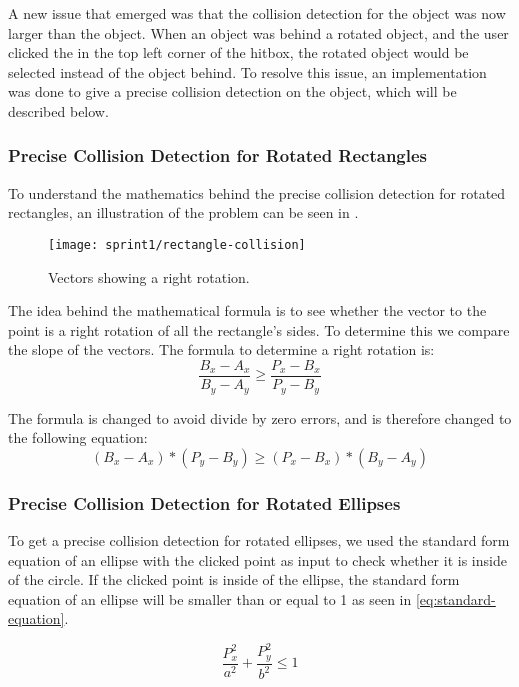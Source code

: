 A new issue that emerged was that the collision detection for the object was now larger than the object.
When an object was behind a rotated object, and the user clicked the in the top left corner of the hitbox, the rotated object would be selected instead of the object behind.
To resolve this issue, an implementation was done to give a precise collision detection on the object, which will be described below.

\subsubsection{Precise Collision Detection for Rotated Rectangles}
To understand the mathematics behind the precise collision detection for rotated rectangles, an illustration of the problem can be seen in .

\begin{figure}[h]
	\centering
	\texttt{[image: sprint1/rectangle-collision]}
	\caption{Vectors showing a right rotation.}
	\label{figure:rectangle-collision}
\end{figure}

The idea behind the mathematical formula is to see whether the vector to the point is a right rotation of all the rectangle's sides.
To determine this we compare the slope of the vectors.
The formula to determine a right rotation is:
\begin{equation}
	\frac{B_x-A_x}{B_y-A_y} \geq \frac{P_x-B_x}{P_y-B_y}
\end{equation}

The formula is changed to avoid divide by zero errors, and is therefore changed to the following equation:
\begin{equation}
	(B_x-A_x)*(P_y-B_y) \geq (P_x-B_x)*(B_y-A_y)
\end{equation} 

\subsubsection{Precise Collision Detection for Rotated Ellipses}
To get a precise collision detection for rotated ellipses, we used the standard form equation of an ellipse with the clicked point as input to check whether it is inside of the circle.
If the clicked point is inside of the ellipse, the standard form equation of an ellipse will be smaller than or equal to 1 as seen in \eqref{eq:standard-equation}.

\begin{equation}\label{eq:standard-equation}
	\frac{P_x^2}{a^2} + \frac{P_y^2}{b^2} \leq 1
\end{equation}

